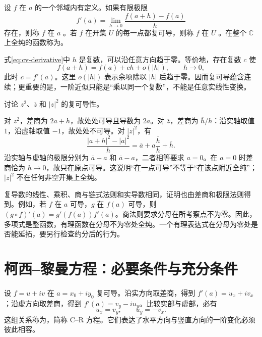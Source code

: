 \documentclass[UTF8,12pt,a4paper,fontset=fandol]{ctexbook}
\begin{document}
\begin{definition}[复导数与全纯性]
设 $f$ 在 $a$ 的一个邻域内有定义。如果有限极限
\begin{equation}
 f'(a)=\lim_{h\to0}\frac{f(a+h)-f(a)}{h}
 \label{eq:cv-derivative}
\end{equation}
存在，则称 $f$ 在 $a$ 。若 $f$ 在开集 $U$ 的每一点都复可导，则称 $f$ 在 $U$ 。在整个 $\mathbb C$ 上全纯的函数称为。
\end{definition}

式\eqref{eq:cv-derivative}中 $h$ 是复数，可以沿任意方向趋于零。等价地，存在复数 $c$ 使
\begin{equation}
 f(a+h)=f(a)+ch+o(|h|),\qquad h\to0,
 \label{eq:cv-linearization}
\end{equation}
此时 $c=f'(a)$。这里 $o(|h|)$ 表示余项除以 $|h|$ 后趋于零。因而复可导蕴含连续；更重要的是，一阶近似只能是“乘以同一个复数”，不能是任意实线性变换。

\begin{example}[三个外形简单但性质不同的函数]
讨论 $z^2$、$\overline z$ 和 $|z|^2$ 的复可导性。
\end{example}
\begin{solve}
对 $z^2$，差商为 $2a+h$，故处处可导且导数为 $2a$。对 $\overline z$，差商为 $\overline h/h$：沿实轴取值 $1$，沿虚轴取值 $-1$，故处处不可导。对 $|z|^2$，有
\[
 \frac{|a+h|^2-|a|^2}{h}
 =\overline a+a\frac{\overline h}{h}+\overline h.
\]
沿实轴与虚轴的极限分别为 $\overline a+a$ 和 $\overline a-a$，二者相等要求 $a=0$。在 $a=0$ 时差商恰为 $\overline h\to0$，故只在原点可导。这说明“在一点可导”不等于“在该点附近全纯”；$|z|^2$ 不在任何非空开集上全纯。
\end{solve}

复导数的线性、乘积、商与链式法则和实导数相同，证明也由差商和极限法则得到。例如，若 $f$ 在 $a$ 可导，$g$ 在 $f(a)$ 可导，则 $(g\circ f)'(a)=g'(f(a))f'(a)$。商法则要求分母在所考察点不为零。因此，多项式是整函数，有理函数在分母不为零处全纯。一个有理表达式在分母为零处是否能延拓，要另行检查约分后的行为。

\section{柯西--黎曼方程：必要条件与充分条件}

设 $f=u+iv$ 在 $a=x_0+iy_0$ 复可导。沿实方向取差商，得到 $f'(a)=u_x+iv_x$；沿虚方向取差商，得到 $f'(a)=v_y-iu_y$。比较实部与虚部，必有
\begin{equation}
 u_x=v_y,\qquad u_y=-v_x.
 \label{eq:cv-cr}
\end{equation}
这组关系称为，简称 C--R 方程。它们表达了水平方向与竖直方向的一阶变化必须彼此相容。
\end{document}
